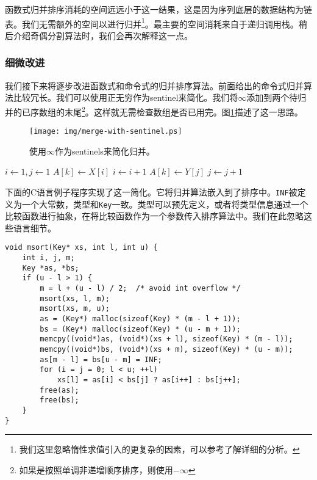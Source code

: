 \documentclass[UTF8]{article}
\begin{document}
函数式归并排序消耗的空间远远小于这一结果，这是因为序列底层的数据结构为链表。我们无需额外的空间以进行归并\footnote{我们这里忽略惰性求值引入的更复杂的因素，可以参考\cite{algo-fp}了解详细的分析。}。最主要的空间消耗来自于递归调用栈。稍后介绍奇偶分割算法时，我们会再次解释这一点。

\subsubsection{细微改进}

我们接下来将逐步改进函数式和命令式的归并排序算法。前面给出的命令式归并算法比较冗长。我们可以使用正无穷作为sentinel来简化\cite{CLRS}。我们将$\infty$添加到两个待归并的已序数组的末尾\footnote{如果是按照单调非递增顺序排序，则使用$-\infty$}。这样就无需检查数组是否已用完。图\ref{fig:merge-with-sentinel}描述了这一思路。

\begin{figure}[htbp]
 \centering
 \texttt{[image: img/merge-with-sentinel.ps]}
 \caption{使用$\infty$作为sentinels来简化归并。}
 \label{fig:merge-with-sentinel}
\end{figure}

\begin{algorithmic}[1]
  \State {}
  \State {}
  \State $i \gets 1, j\gets 1$
      \State $A[k] \gets X[i]$
      \State $i \gets i + 1$
    \Else
      \State $A[k] \gets Y[j]$
      \State $j \gets j + 1$
    \EndIf
  \EndFor
\EndProcedure
\end{algorithmic}

下面的C语言例子程序实现了这一简化。它将归并算法嵌入到了排序中。\texttt{INF}被定义为一个大常数，类型和\texttt{Key}一致。类型可以预先定义，或者将类型信息通过一个比较函数进行抽象，在将比较函数作为一个参数传入排序算法中。我们在此忽略这些语言细节。

\lstset{language=C}
\begin{lstlisting}
void msort(Key* xs, int l, int u) {
    int i, j, m;
    Key *as, *bs;
    if (u - l > 1) {
        m = l + (u - l) / 2;  /* avoid int overflow */
        msort(xs, l, m);
        msort(xs, m, u);
        as = (Key*) malloc(sizeof(Key) * (m - l + 1));
        bs = (Key*) malloc(sizeof(Key) * (u - m + 1));
        memcpy((void*)as, (void*)(xs + l), sizeof(Key) * (m - l));
        memcpy((void*)bs, (void*)(xs + m), sizeof(Key) * (u - m));
        as[m - l] = bs[u - m] = INF;
        for (i = j = 0; l < u; ++l)
            xs[l] = as[i] < bs[j] ? as[i++] : bs[j++];
        free(as);
        free(bs);
    }
}
\end{lstlisting}
\end{document}
